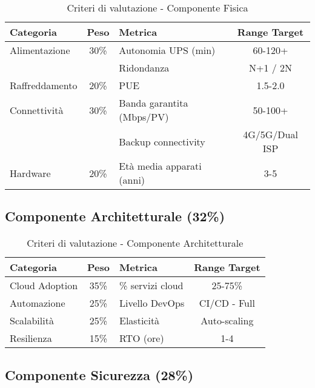\begin{table}[H]
\centering
\caption{Criteri di valutazione - Componente Fisica}
\small
\sffamily
\begin{tabular}{l c l c}
\toprule
\textbf{Categoria} & \textbf{Peso} & \textbf{Metrica} & \textbf{Range Target} \\
\midrule
Alimentazione & 30\% & Autonomia UPS (min) & 60-120+ \\
& & Ridondanza & N+1 / 2N \\
Raffreddamento & 20\% & PUE & 1.5-2.0 \\
Connettività & 30\% & Banda garantita (Mbps/PV) & 50-100+ \\
& & Backup connectivity & 4G/5G/Dual ISP \\
Hardware & 20\% & Età media apparati (anni) & 3-5 \\
\bottomrule
\end{tabular}
\end{table}

\subsection{\texorpdfstring{Componente Architetturale (32\%)}{B.3.2 - Componente Architetturale (32\%)}}

\begin{table}[H]
\centering
\caption{Criteri di valutazione - Componente Architetturale}
\small
\sffamily
\begin{tabular}{l c l c}
\toprule
\textbf{Categoria} & \textbf{Peso} & \textbf{Metrica} & \textbf{Range Target} \\
\midrule
Cloud Adoption & 35\% & \% servizi cloud & 25-75\% \\
Automazione & 25\% & Livello DevOps & CI/CD - Full \\
Scalabilità & 25\% & Elasticità & Auto-scaling \\
Resilienza & 15\% & RTO (ore) & 1-4 \\
\bottomrule
\end{tabular}
\end{table}

\subsection{\texorpdfstring{Componente Sicurezza (28\%)}{B.3.3 - Componente Sicurezza (28\%)}}

